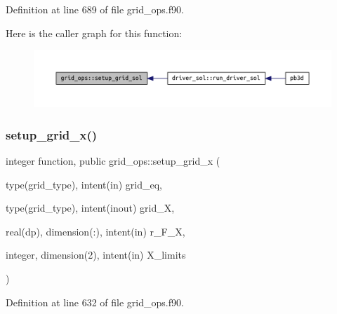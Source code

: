 Definition at line 689 of file grid\+\_\+ops.\+f90.

Here is the caller graph for this function\+:
\nopagebreak
\begin{figure}[H]
\begin{center}
\leavevmode
\includegraphics[width=350pt]{namespacegrid__ops_ae4f50f7b63e0a8b84dae6b98fd3e5d71_icgraph}
\end{center}
\end{figure}
\mbox{\label{namespacegrid__ops_a1047889ec84da6e56aae619570a16988}} 
\subsubsection{\texorpdfstring{setup\+\_\+grid\+\_\+x()}{setup\_grid\_x()}}
{\footnotesize\ttfamily integer function, public grid\+\_\+ops\+::setup\+\_\+grid\+\_\+x (\begin{DoxyParamCaption}\item[{type(grid\+\_\+type), intent(in)}]{grid\+\_\+eq,  }\item[{type(grid\+\_\+type), intent(inout)}]{grid\+\_\+X,  }\item[{real(dp), dimension(\+:), intent(in)}]{r\+\_\+\+F\+\_\+X,  }\item[{integer, dimension(2), intent(in)}]{X\+\_\+limits }\end{DoxyParamCaption})}



Definition at line 632 of file grid\+\_\+ops.\+f90.

